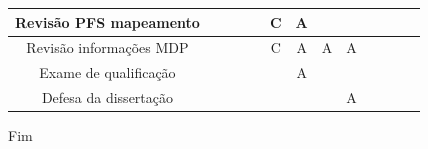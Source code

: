 \documentclass[10pt]{beamer}
\begin{document}
\begin{frame}
\begin{table}[htb]
{\begin{tabular}{|c|c|c|c|c|c|c|c|c|c|c|c|c|}
				\hline
				Revisão PFS mapeamento
				&
				&
				&
				&
				& \cellcolor[HTML]{9AFF99}C
				& \cellcolor[HTML]{FFCB2F}A
				&
				& \\
				
				\hline
				Revisão informações MDP
				&
				&
				&
				&
				& \cellcolor[HTML]{9AFF99}C
				& \cellcolor[HTML]{FFCB2F}A
				& \cellcolor[HTML]{FFCB2F}A
				& \cellcolor[HTML]{FFCB2F}A \\
				
				\hline
				Exame de qualificação
				&
				& 
				&
				&
				&
				& \cellcolor[HTML]{FFCB2F}A
				&
				& \\
				
				\hline
				Defesa da dissertação
				&
				&
				&
				&
				&
				&
				&
				& \cellcolor[HTML]{FFCB2F}A \\
				\hline
				
		\end{tabular}}
	\end{table}
	
	
\end{frame}
\begin{frame}
\Huge{\centerline{Fim}}
\end{frame}
\end{document}
